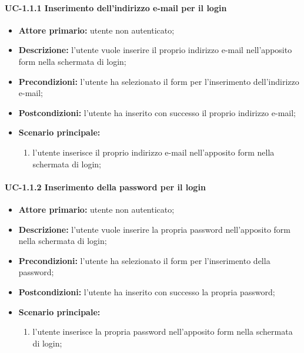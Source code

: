   \paragraph{UC-1.1.1 Inserimento dell'indirizzo e-mail per il login}

	\begin{itemize}
		\item \textbf{Attore primario:} utente non autenticato;

		\item \textbf{Descrizione:} l'utente vuole inserire il proprio indirizzo e-mail nell'apposito form nella schermata di login;

		\item \textbf{Precondizioni:} l'utente ha selezionato il form per l'inserimento dell'indirizzo e-mail;

		\item \textbf{Postcondizioni:} l'utente ha inserito con successo il proprio indirizzo e-mail;

		\item \textbf{Scenario principale:}
	  		\begin{enumerate}
		  		\item l'utente inserisce il proprio indirizzo e-mail nell'apposito form nella schermata di login; 
	  		\end{enumerate}
	\end{itemize}

\paragraph{UC-1.1.2 Inserimento della password per il login}

	\begin{itemize}
		\item \textbf{Attore primario:} utente non autenticato;

		\item \textbf{Descrizione:} l'utente vuole inserire la propria password nell'apposito form nella schermata di login;

		\item \textbf{Precondizioni:} l'utente ha selezionato il form per l'inserimento della password;

		\item \textbf{Postcondizioni:} l'utente ha inserito con successo la propria password;

		\item \textbf{Scenario principale:}
	  		\begin{enumerate}
			  \item l'utente inserisce la propria password nell'apposito form nella schermata di login; 
	  		\end{enumerate}
	\end{itemize}


